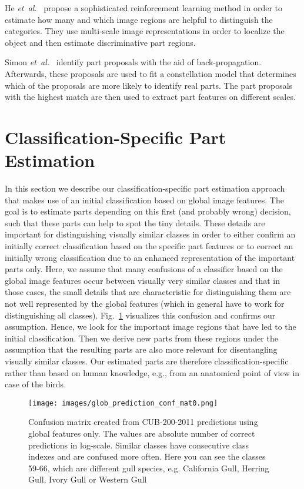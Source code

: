 \documentclass[runningheads]{llncs}
\newcommand{\etal}{\emph{et~al.}}
\begin{document}
He \etal~\cite{he2019and} propose a sophisticated reinforcement learning method in order to estimate how many and which image regions are helpful to distinguish the categories.
They use multi-scale image representations in order to localize the object and then estimate discriminative part regions.

Simon \etal~\cite{Simon_2015_ICCV} identify part proposals with the aid of back-propagation.
Afterwards, these proposals are used to fit a constellation model that determines which of the proposals are more likely to identify real parts.
The part proposals with the highest match are then used to extract part features on different scales.
 	\section{Classification-Specific Part Estimation}
\label{sec:methods}

In this section we describe our classification-specific part estimation approach that makes use of an initial classification based on global image features.
The goal is to estimate parts depending on this first (and probably wrong) decision, such that these parts can help to spot the tiny details.
These details are important for distinguishing visually similar classes in order to either confirm an initially correct classification based on the specific part features or to correct an initially wrong classification due to an enhanced representation of the important parts only.
Here, we assume that many confusions of a classifier based on the global image features occur between visually very similar classes and that in those cases, the small details that are characteristic for distinguishing them are not well represented by the global features (which in general have to work for distinguishing all classes).
Fig.~\ref{fig:cub200_conf_matrix} visualizes this confusion and confirms our assumption.
Hence, we look for the important image regions that have led to the initial classification.
Then we derive new parts from these regions under the assumption that the resulting parts are also more relevant for disentangling visually similar classes.
Our estimated parts are therefore classification-specific rather than based on human knowledge, e.g., from an anatomical point of view in case of the birds.

\begin{figure}[t]
	\centering
	\texttt{[image: images/glob\_prediction\_conf\_mat0.png]}
	\caption{
	Confusion matrix created from CUB-200-2011 predictions using global features only.
	The values are absolute number of correct predictions in log-scale.
	Similar classes have consecutive class indexes and are confused more often.
	Here you can see the classes 59-66, which are different gull species, e.g. California Gull, Herring Gull, Ivory Gull or Western Gull}
	\label{fig:cub200_conf_matrix}
\end{figure}
\end{document}
